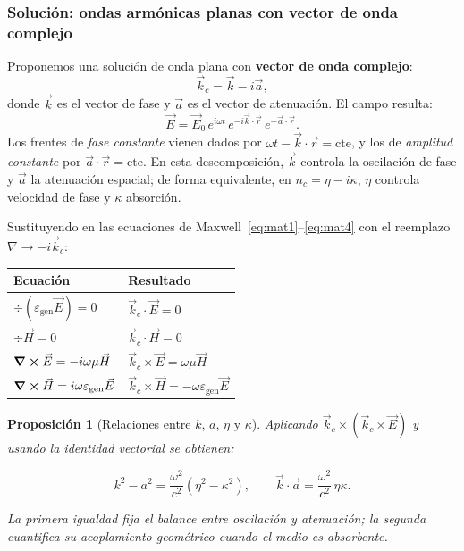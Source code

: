\documentclass[12pt, a4paper]{article}
\theoremstyle{plain}
\newtheorem{proposicion}[teorema]{Proposición}
\theoremstyle{definition}
\theoremstyle{remark}
\newcommand{\ve}[1]{\vec{#1}}
\begin{document}
\subsubsection{Solución: ondas armónicas planas con vector de onda complejo}

Proponemos una solución de onda plana con \textbf{vector de onda complejo}:
\[
  \ve{k}_c = \ve{k} - i\ve{a},
\]
donde $\ve{k}$ es el vector de fase y $\ve{a}$ es el vector de atenuación.
El campo resulta:
\begin{equation}
  \ve{E} = \ve{E}_0\,e^{i\omega t}\,e^{-i\ve{k}\cdot\ve{r}}\,e^{-\ve{a}\cdot\ve{r}}.
  \label{eq:onda_compleja}
\end{equation}
Los frentes de \emph{fase constante} vienen dados por $\omega t - \ve{k}\cdot\ve{r} = \mathrm{cte}$,
y los de \emph{amplitud constante} por $\ve{a}\cdot\ve{r}=\mathrm{cte}$.
En esta descomposición, $\ve{k}$ controla la oscilación de fase y $\ve{a}$ la
atenuación espacial; de forma equivalente, en $n_c=\eta-i\kappa$, $\eta$
controla velocidad de fase y $\kappa$ absorción.

Sustituyendo en las ecuaciones de Maxwell~\eqref{eq:mat1}--\eqref{eq:mat4}
con el reemplazo $\nabla\to -i\ve{k}_c$:

\begin{center}
\begin{tabularx}{0.95\linewidth}{@{}L{5.2cm}Y@{}}
  \toprule
  Ecuación & Resultado \\
  \midrule
  $\div(\varepsilon_\text{gen}\ve{E})=0$ & $\ve{k}_c\cdot\ve{E}=0$ \\
  $\div\ve{H}=0$                          & $\ve{k}_c\cdot\ve{H}=0$ \\
  $\curl\ve{E}=-i\omega\mu\ve{H}$         & $\ve{k}_c\times\ve{E}=\omega\mu\ve{H}$ \\
  $\curl\ve{H}=i\omega\varepsilon_\text{gen}\ve{E}$ &
    $\ve{k}_c\times\ve{H}=-\omega\varepsilon_\text{gen}\ve{E}$ \\
  \bottomrule
\end{tabularx}
\end{center}

\begin{proposicion}[Relaciones entre $k$, $a$, $\eta$ y $\kappa$]
Aplicando $\ve{k}_c\times(\ve{k}_c\times\ve{E})$ y usando la identidad
vectorial se obtienen:
\begin{mdframed}[style=resultado]
\begin{equation}
  k^2 - a^2 = \frac{\omega^2}{c^2}(\eta^2-\kappa^2), \qquad
  \ve{k}\cdot\ve{a} = \frac{\omega^2}{c^2}\,\eta\kappa.
  \label{eq:relaciones_ka}
\end{equation}
\end{mdframed}
\noindent
La primera igualdad fija el balance entre oscilación y atenuación; la segunda
cuantifica su acoplamiento geométrico cuando el medio es absorbente.
\end{proposicion}
\end{document}
